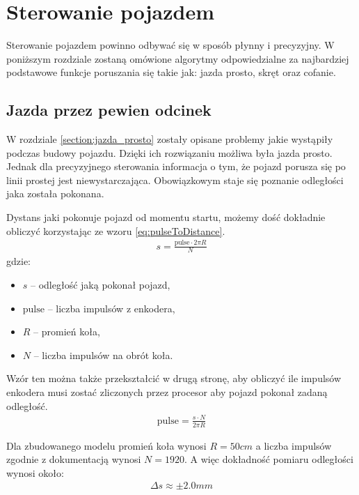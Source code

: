\section{Sterowanie pojazdem}
    Sterowanie pojazdem powinno odbywać się w sposób płynny i precyzyjny.
    W poniższym rozdziale zostaną omówione algorytmy odpowiedzialne za najbardziej podstawowe funkcje poruszania się takie jak: jazda prosto, skręt oraz cofanie.

    \subsection{Jazda przez pewien odcinek}
    \label{subsec:jazda_przez_odcinek}
        W rozdziale \ref{section:jazda_prosto} zostały opisane problemy jakie wystąpiły podczas budowy pojazdu. %
        Dzięki ich rozwiązaniu możliwa była jazda prosto.
        Jednak dla precyzyjnego sterowania informacja o tym, że pojazd porusza się po linii prostej jest niewystarczająca.
        Obowiązkowym staje się poznanie odległości jaka została pokonana.

        Dystans jaki pokonuje pojazd od momentu startu, możemy dość dokładnie obliczyć korzystając ze wzoru \eqref{eq:pulseToDistance}.
        \begin{gather}
            s = \frac{\text{pulse} \cdot 2\pi R}{N}
            \label{eq:pulseToDistance}
        \end{gather}
        gdzie:
        \begin{itemize}
            \item $s$ -- odległość jaką pokonał pojazd,
            \item $\text{pulse}$ -- liczba impulsów z enkodera,
            \item $R$ -- promień koła,
            \item $N$ -- liczba impulsów na obrót koła.
        \end{itemize}

        Wzór ten można także przekształcić w drugą stronę, aby obliczyć ile impulsów enkodera musi zostać zliczonych przez procesor aby pojazd pokonał zadaną odległość.
        \begin{gather}
            \text{pulse} = \frac{s \cdot N}{2\pi R}
            \label{eq:distanceToPulse}
        \end{gather}

        Dla zbudowanego modelu promień koła wynosi $R = 50cm$ a liczba impulsów zgodnie z dokumentacją wynosi $N = 1920$.
        A więc dokładność pomiaru odległości wynosi około:
        \begin{gather}
            \Delta s \approx \pm2.0mm
        \end{gather}

